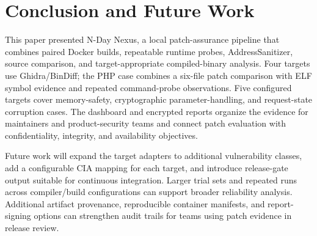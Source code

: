 \documentclass[conference]{IEEEtran}
\newcommand{\tool}{N-Day Nexus}
\begin{document}
\section{Conclusion and Future Work}
This paper presented \tool{}, a local patch-assurance pipeline that combines paired Docker builds, repeatable runtime probes, AddressSanitizer, source comparison, and target-appropriate compiled-binary analysis. Four targets use Ghidra/BinDiff; the PHP case combines a six-file patch comparison with ELF symbol evidence and repeated command-probe observations. Five configured targets cover memory-safety, cryptographic parameter-handling, and request-state corruption cases. The dashboard and encrypted reports organize the evidence for maintainers and product-security teams and connect patch evaluation with confidentiality, integrity, and availability objectives.

Future work will expand the target adapters to additional vulnerability classes, add a configurable CIA mapping for each target, and introduce release-gate output suitable for continuous integration. Larger trial sets and repeated runs across compiler/build configurations can support broader reliability analysis. Additional artifact provenance, reproducible container manifests, and report-signing options can strengthen audit trails for teams using patch evidence in release review.
\end{document}
